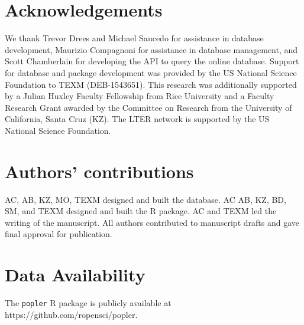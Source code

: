 \documentclass{article}\usepackage[]{graphicx}\usepackage[]{color}
\begin{document}
\section*{Acknowledgements}
We thank Trevor Drees and Michael Saucedo for assistance in database development, Maurizio Compagnoni for assistance in database management, and Scott Chamberlain for developing the API to query the online database. Support for database and package development was provided by the US National Science Foundation to TEXM (DEB-1543651). This research was additionally supported by a Julian Huxley Faculty Fellowship from Rice University and a Faculty Research Grant awarded by the Committee on Research from the University of California, Santa Cruz (KZ). The LTER network is supported by the US National Science Foundation.

\section*{Authors' contributions}
AC, AB, KZ, MO, TEXM designed and built the database. AC AB, KZ, BD, SM, and TEXM designed and built the R package. AC and TEXM led the writing of the manuscript. All authors contributed to manuscript drafts and gave final approval for publication.

\section*{Data Availability}
The \texttt{popler} R package is publicly available at https://github.com/ropensci/popler.

\newpage

\end{document}
